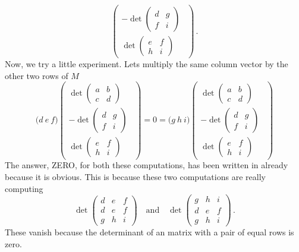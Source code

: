 {\[\begin{pmatrix}
-\det\begin{pmatrix}d&g\\f&i\end{pmatrix}\ \ \\[2mm]
\det\begin{pmatrix}e&f\\h&i\end{pmatrix}\end{pmatrix}\, .
\]
Now, we try a little experiment. Lets multiply the same column vector by the other two rows of $M$
\[
 \Big( d \ e \ f \Big)
\begin{pmatrix} \det\begin{pmatrix}a&b\\c&d\end{pmatrix}\\[2mm]
-\det\begin{pmatrix}d&g\\f&i\end{pmatrix}\ \ \\[2mm]
\det\begin{pmatrix}e&f\\h&i\end{pmatrix}\end{pmatrix} = 0 =
 \Big( g \ h \ i \Big)
\begin{pmatrix} \det\begin{pmatrix}a&b\\c&d\end{pmatrix}\\[2mm]
-\det\begin{pmatrix}d&g\\f&i\end{pmatrix}\ \ \\[2mm]
\det\begin{pmatrix}e&f\\h&i\end{pmatrix}\end{pmatrix}
\]
The answer, ZERO, for both these computations, has been written in already because it is obvious. This is because these two computations are really computing
\[
\det\begin{pmatrix}
d &e&f\\d&e&f\\g&h&i\end{pmatrix}
\quad\mbox{and} \quad \det\begin{pmatrix}
g &h&i\\d&e&f\\g&h&i\end{pmatrix}\, .
\]
These vanish because the determinant of an matrix with a pair of equal rows is zero.
}
